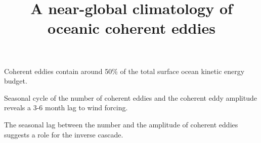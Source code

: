 \documentclass[draft,linenumbers]{agujournal2019}
\begin{document}
\title{A near-global climatology of oceanic coherent eddies}



\begin{keypoints}
	\item Coherent eddies 
	contain around 50\% of the total
	surface ocean kinetic energy budget.
	\item Seasonal cycle of the number of coherent eddies and the
	coherent eddy amplitude reveals a 3-6 month lag to wind forcing.
	\item The seasonal lag between the number and 
	the amplitude of coherent eddies suggests a role for the inverse cascade.
\end{keypoints}
\end{document}
